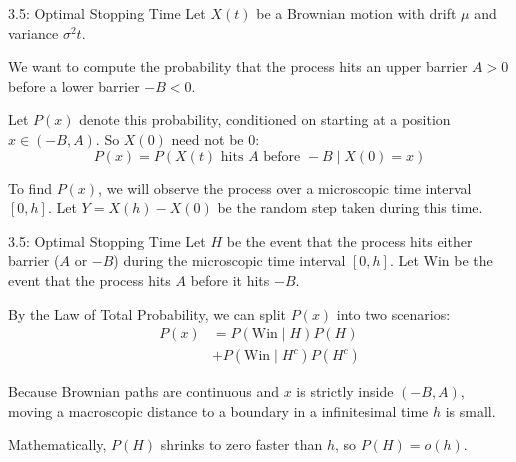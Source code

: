 \documentclass{beamer}
\begin{document}
	\begin{frame}{3.5: Optimal Stopping Time}
		Let $X(t)$ be a Brownian motion with drift $\mu$ and variance $\sigma^2t$.
		
		\vspace{0.3cm}
		We want to compute the probability that the process hits an upper barrier $A > 0$ before a lower barrier $-B < 0$.
		
		\vspace{0.3cm}
		Let $P(x)$ denote this probability, conditioned on starting at a position $x \in (-B, A)$. So $X(0)$ need not be 0:
		$$P(x) = P(X(t) \text{ hits } A \text{ before } -B \mid X(0) = x)$$
		
		\vspace{0.3cm}
		To find $P(x)$, we will observe the process over a microscopic time interval $[0, h]$. Let $Y = X(h) - X(0)$ be the random step taken during this time.
	\end{frame}
	
	\begin{frame}{3.5: Optimal Stopping Time}
		Let $H$ be the event that the process hits either barrier ($A$ or $-B$) during the microscopic time interval $[0, h]$. Let Win be the event that the process hits $A$ before it hits $-B$.
		
		\vspace{0.3cm}
		By the Law of Total Probability, we can split $P(x)$ into two scenarios:
		\begin{align*}
			P(x) &= P(\text{Win} \mid H) P(H) \\
			&+ P(\text{Win} \mid H^c) P(H^c)
		\end{align*}
		
		\vspace{0.3cm}
		Because Brownian paths are continuous and $x$ is strictly inside $(-B, A)$, moving a macroscopic distance to a boundary in a infinitesimal time $h$ is small.
		
		\vspace{0.3cm}
		Mathematically, $P(H)$ shrinks to zero faster than $h$, so $P(H) = o(h)$.
	\end{frame}
	
\end{document}
